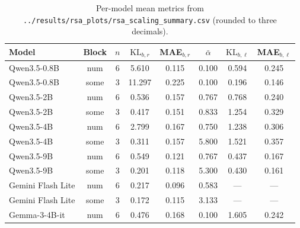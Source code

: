 \documentclass[11pt]{article}
\begin{document}
\begin{table}[t]

  \centering

  \footnotesize

  \setlength{\tabcolsep}{4pt}

  \renewcommand{\arraystretch}{0.92}

  \caption{Per-model mean metrics from \texttt{../results/rsa\_plots/rsa\_scaling\_summary.csv} (rounded to three decimals).}

  \label{tab:fullpanel}

  \begin{tabular}{@{}p{2.6cm}ccccccc@{}}

  \toprule

  Model & Block & $n$ & $\mathrm{KL}_{b,r}$ & MAE$_{b,r}$ & $\bar\alpha$ & $\mathrm{KL}_{b,\ell}$ & MAE$_{b,\ell}$ \\

  \midrule

  Qwen3.5-0.8B & num & 6 & 5.610 & 0.115 & 0.100 & 0.594 & 0.245 \\

  Qwen3.5-0.8B & some & 3 & 11.297 & 0.225 & 0.100 & 0.196 & 0.146 \\

  Qwen3.5-2B & num & 6 & 0.536 & 0.157 & 0.767 & 0.768 & 0.240 \\

  Qwen3.5-2B & some & 3 & 0.417 & 0.151 & 0.833 & 1.254 & 0.329 \\

  Qwen3.5-4B & num & 6 & 2.799 & 0.167 & 0.750 & 1.238 & 0.306 \\

  Qwen3.5-4B & some & 3 & 0.311 & 0.157 & 5.800 & 1.521 & 0.357 \\

  Qwen3.5-9B & num & 6 & 0.549 & 0.121 & 0.767 & 0.437 & 0.167 \\

  Qwen3.5-9B & some & 3 & 0.201 & 0.118 & 5.300 & 0.430 & 0.161 \\

  Gemini Flash Lite & num & 6 & 0.217 & 0.096 & 0.583 & --- & --- \\

  Gemini Flash Lite & some & 3 & 0.172 & 0.115 & 3.133 & --- & --- \\

  Gemma-3-4B-it & num & 6 & 0.476 & 0.168 & 0.100 & 1.605 & 0.242 \\


\end{tabular}
\end{table}
\end{document}
